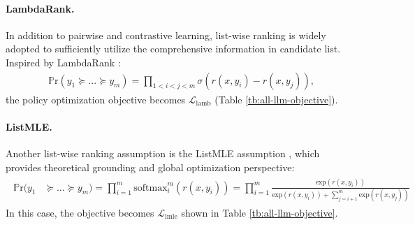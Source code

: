 \paragraph{LambdaRank.}
In addition to pairwise and contrastive learning, list-wise ranking is widely adopted to sufficiently utilize the comprehensive information in candidate list.
Inspired by LambdaRank \citep{burges2010ranknet, zeng2022curriculum}:
\begin{gather}\label{eq:lambdarank-assumption}
    \mathbb{P}\text{r}(y_1 \succeq ... \succeq y_m) = \prod_{1<i<j<m} \sigma(r(x,y_i) - r(x,y_j)),
\end{gather}
the policy optimization objective becomes $\mathcal{L}_{\text{lamb}}$ (Table \ref{tb:all-llm-objective}).


\paragraph{ListMLE.}
Another list-wise ranking assumption is the ListMLE assumption \citep{xia2008listwise}, which provides theoretical grounding and global optimization perspective:
\begin{gather}\label{eq:listmle-assumption}
\begin{aligned}
    \mathbb{P}\text{r}(y_1 & \succeq ... \succeq y_m) = \prod^m_{i=1} \text{softmax}^m_i(r(x, y_i))  = \prod^m_{i=1} \frac{\text{exp}(r(x,y_i))}{\text{exp}(r(x,y_i)) + \sum^m_{j=i+1}\text{exp}(r(x,y_j))}
\end{aligned}
\end{gather}
In this case, the objective becomes $\mathcal{L}_{\text{lmle}}$ shown in Table \ref{tb:all-llm-objective}.


